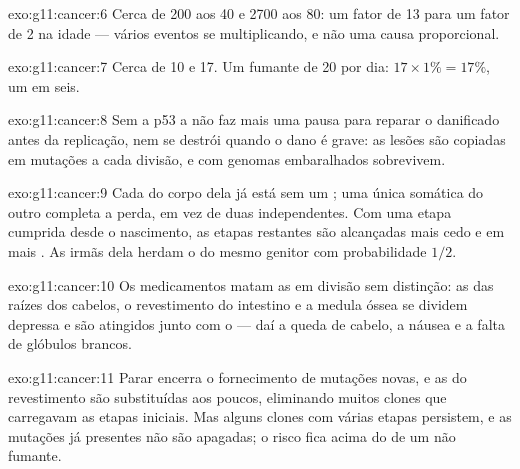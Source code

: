 \begin{solution}{exo:g11:cancer:6}
Cerca de 200 aos 40 e 2700 aos 80: um fator de 13 para um fator de 2 na
idade --- vários eventos se multiplicando, e não uma causa proporcional.
\end{solution}

\begin{solution}{exo:g11:cancer:7}
Cerca de 10 e 17. Um fumante de 20 por dia: $17 \times 1\% = 17\%$, um
em seis.
\end{solution}

\begin{solution}{exo:g11:cancer:8}
Sem a p53 a  não faz mais uma pausa para reparar o  danificado
antes da replicação, nem se destrói quando o dano é grave: as lesões
são copiadas em mutações a cada divisão, e  com genomas
embaralhados sobrevivem.
\end{solution}

\begin{solution}{exo:g11:cancer:9}
Cada  do corpo dela já está sem um ; uma única 
somática do outro completa a perda, em vez de duas independentes. Com
uma etapa cumprida desde o nascimento, as etapas restantes são
alcançadas mais cedo e em mais . As irmãs dela herdam o  do
mesmo genitor com probabilidade $1/2$.
\end{solution}

\begin{solution}{exo:g11:cancer:10}
Os medicamentos matam as  em divisão sem distinção: as 
das raízes dos cabelos, o revestimento do intestino e a medula óssea se
dividem depressa e são atingidos junto com o  --- daí a queda de
cabelo, a náusea e a falta de glóbulos brancos.
\end{solution}

\begin{solution}{exo:g11:cancer:11}
Parar encerra o fornecimento de mutações novas, e as  do
revestimento são substituídas aos poucos, eliminando muitos clones que
carregavam as etapas iniciais. Mas alguns clones com várias etapas
persistem, e as mutações já presentes não são apagadas; o risco fica
acima do de um não fumante.
\end{solution}

